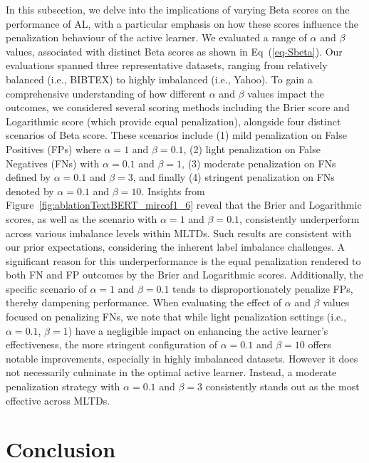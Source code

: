 \documentclass[letterpaper]{article} %
\begin{document}
In this subsection, we delve into the implications of varying Beta scores on the performance of AL, with a particular emphasis on how these scores influence the penalization behaviour of the active learner.
We evaluated a range of $\alpha$ and $\beta$ values, associated with distinct Beta scores as shown in Eq~(\ref{eq-Sbeta}).
Our evaluations spanned three representative datasets, ranging from relatively balanced (i.e., BIBTEX) to highly imbalanced (i.e., Yahoo). To gain a comprehensive understanding of how different $\alpha$ and $\beta$ values impact the outcomes, we considered several scoring methods including the Brier score and Logarithmic score (which provide equal penalization), alongside four distinct scenarios of Beta score. These scenarios include (1) mild penalization on False Positives (FPs) where $\alpha=1$ and $\beta=0.1$, (2) light penalization on False Negatives (FNs) with $\alpha=0.1$ and $\beta=1$, (3) moderate penalization on FNs defined by $\alpha=0.1$ and $\beta=3$, and finally (4) stringent penalization on FNs denoted by $\alpha=0.1$ and $\beta=10$.  Insights from Figure~\ref{fig:ablationTextBERT_mircof1_6} reveal that the Brier and Logarithmic scores, as well as the scenario with $\alpha=1$ and $\beta=0.1$, consistently underperform across various imbalance levels within MLTDs.
Such results are consistent with our prior expectations, considering the inherent label imbalance challenges.
A significant reason for this underperformance is the equal penalization rendered to both FN and FP outcomes by the Brier and Logarithmic scores. Additionally, the specific scenario of $\alpha=1$ and $\beta=0.1$ tends to disproportionately penalize FPs, thereby dampening performance. When evaluating the effect of $\alpha$ and $\beta$ values focused on penalizing FNs, we note that while light penalization settings (i.e., $\alpha=0.1$, $\beta=1$) have a negligible impact on enhancing the active learner's effectiveness, the more stringent configuration of $\alpha=0.1$ and $\beta=10$ offers notable improvements, especially in highly imbalanced datasets. However it does not necessarily culminate in the optimal active learner.
Instead, a moderate penalization strategy with $\alpha=0.1$ and $\beta=3$ consistently stands out as the most effective across MLTDs.







\vspace{-0.75mm}
\section{Conclusion}
\end{document}
